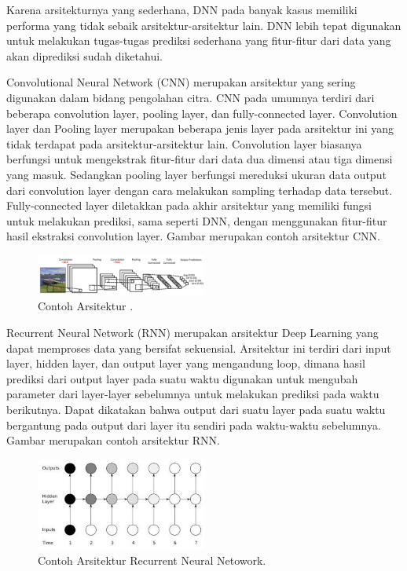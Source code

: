 Karena arsitekturnya yang sederhana, DNN pada banyak kasus memiliki performa yang tidak sebaik arsitektur-arsitektur lain. DNN lebih tepat digunakan untuk melakukan tugas-tugas prediksi sederhana yang fitur-fitur dari data yang akan diprediksi sudah diketahui.

Convolutional Neural Network (CNN) merupakan arsitektur \deeplearning yang sering digunakan dalam bidang pengolahan citra. CNN pada umumnya terdiri dari beberapa convolution layer, pooling layer, dan fully-connected layer. Convolution layer dan Pooling layer merupakan beberapa jenis layer pada arsitektur ini yang tidak terdapat pada arsitektur-arsitektur lain. Convolution layer biasanya berfungsi untuk mengekstrak fitur-fitur dari data dua dimensi atau tiga dimensi yang masuk. Sedangkan pooling layer berfungsi mereduksi ukuran data output dari convolution layer dengan cara melakukan sampling terhadap data tersebut. Fully-connected layer diletakkan pada akhir arsitektur yang memiliki fungsi untuk melakukan prediksi, sama seperti DNN, dengan menggunakan fitur-fitur hasil ekstraksi convolution layer. Gambar merupakan contoh arsitektur CNN.

\begin{figure}
	\centering
	\includegraphics[width=0.50\textwidth]
	{pics/cnn.png}
	\caption{Contoh Arsitektur \conv \nn.}
	\label{fig:cnn}
\end{figure}


Recurrent Neural Network (RNN) merupakan arsitektur Deep Learning yang dapat memproses data yang bersifat sekuensial. Arsitektur ini terdiri dari input layer, hidden layer, dan output layer yang mengandung loop, dimana hasil prediksi dari output layer pada suatu waktu digunakan untuk mengubah parameter dari layer-layer sebelumnya untuk melakukan prediksi pada waktu berikutnya. Dapat dikatakan bahwa output dari suatu layer pada suatu waktu bergantung pada output dari layer itu sendiri pada waktu-waktu sebelumnya. Gambar merupakan contoh arsitektur RNN.

\begin{figure}
	\centering
	\includegraphics[width=0.50\textwidth]
	{pics/rnn.jpeg}
	\caption{Contoh Arsitektur Recurrent Neural Netowork.}
	\label{fig:rnn}
\end{figure}

